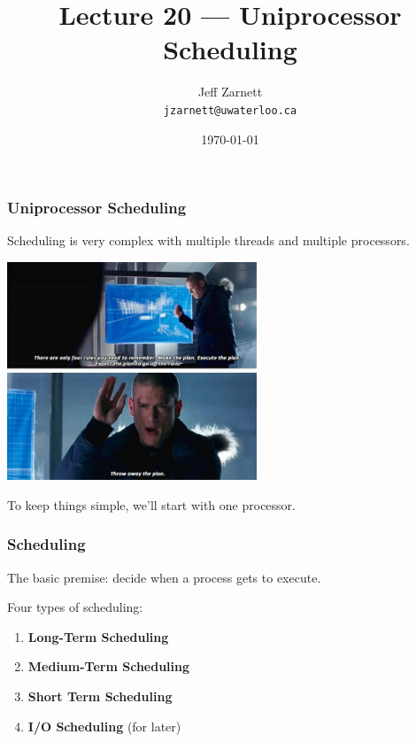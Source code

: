 

\title{Lecture 20 --- Uniprocessor Scheduling }

\author{Jeff Zarnett \\ \small \texttt{jzarnett@uwaterloo.ca}}
\date{\today}




\begin{frame}
  \titlepage

 \end{frame}



\begin{frame}
\frametitle{Uniprocessor Scheduling}

Scheduling is very complex with multiple threads and multiple processors.

\begin{center}
	\includegraphics[width=0.56\textwidth]{images/makeplan.jpg}
\end{center}

To keep things simple, we'll start with one processor.


\end{frame}


\begin{frame}
\frametitle{Scheduling}

The basic premise: decide when a process gets to execute. 

Four types of scheduling: 

\begin{enumerate}
	\item \textbf{Long-Term Scheduling}
	\item \textbf{Medium-Term Scheduling}
	\item \textbf{Short Term Scheduling}
	\item \textbf{I/O Scheduling} (for later)
\end{enumerate}

\end{frame}



